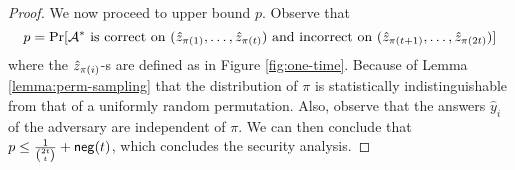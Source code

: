 \begin{proof}
We now proceed to upper bound $p$. Observe that 
\[ 
p = \Pr[\mathcal{A}^* \text{ is correct on } (\hat{z}_{\pi(1)},\dots,\hat{z}_{\pi(t)}) \text{ and incorrect on } (\hat{z}_{\pi(t+1)},\dots,\hat{z}_{\pi(2t)})] 
\]
where the $\hat{z}_{\pi(i)}$-s are defined as in Figure \ref{fig:one-time}.
Because of Lemma \ref{lemma:perm-sampling} that the distribution of $\pi$ is statistically indistinguishable from that of a uniformly random permutation. Also, observe that the answers $\hat{y}_i$ of the adversary are independent of $\pi$.
We can then conclude that $p \leq \frac{1}{\binom{2t} {t}} + \mathsf{neg}(t)$, which concludes the security analysis. 



\end{proof}